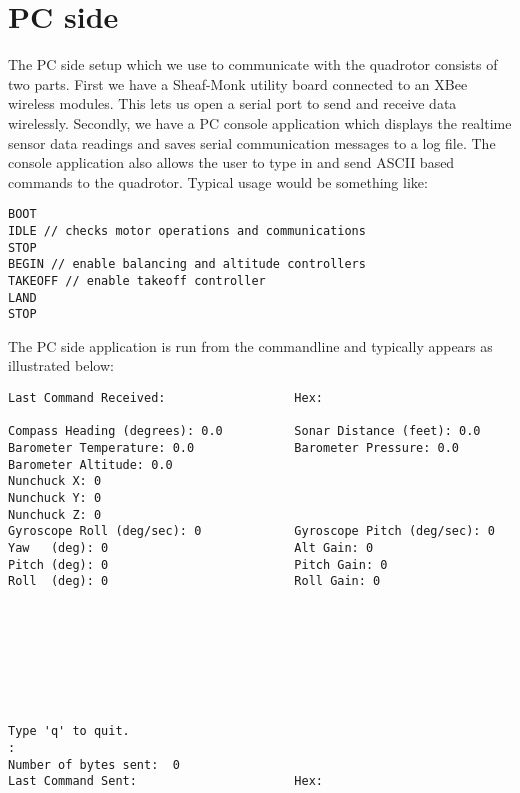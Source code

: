 \section{PC side}
The PC side setup which we use to communicate with the quadrotor consists of two parts. First we have a Sheaf-Monk utility board connected to an XBee wireless modules.  This lets us open a serial port to send and receive data wirelessly.  Secondly, we have a PC console application which displays the realtime sensor data readings and saves serial communication messages to a log file.  The console application also allows the user to type in and send ASCII based commands to the quadrotor.  Typical usage would be something like:\\
\newline
\begin{lstlisting}[frame=single]
BOOT
IDLE // checks motor operations and communications
STOP
BEGIN // enable balancing and altitude controllers
TAKEOFF // enable takeoff controller
LAND
STOP 
\end{lstlisting}

\clearpage
The PC side application is run from the commandline and typically appears as illustrated below:\\
\begin{lstlisting}[frame=single]
Last Command Received:                  Hex:

Compass Heading (degrees): 0.0          Sonar Distance (feet): 0.0
Barometer Temperature: 0.0              Barometer Pressure: 0.0
Barometer Altitude: 0.0
Nunchuck X: 0
Nunchuck Y: 0
Nunchuck Z: 0
Gyroscope Roll (deg/sec): 0             Gyroscope Pitch (deg/sec): 0
Yaw   (deg): 0                          Alt Gain: 0
Pitch (deg): 0                          Pitch Gain: 0
Roll  (deg): 0                          Roll Gain: 0








Type 'q' to quit.
:
Number of bytes sent:  0
Last Command Sent:                      Hex:
\end{lstlisting}
